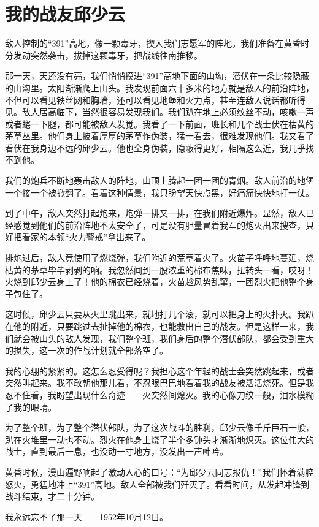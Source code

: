 \documentclass[12pt,UTF-8,openany]{ctexbook}
\begin{document}
\chapter{我的战友邱少云}

\begin{large}
    
    敌人控制的“391”高地，像一颗毒牙，揳入我们志愿军的阵地。我们准备在黄昏时分发动突然袭击，拔掉这颗毒牙，把战线往南推移。
    
    那一天，天还没有亮，我们悄悄摸进“391”高地下面的山坳，潜伏在一条比较隐蔽的山沟里。太阳渐渐爬上山头。我发现前面六十多米的地方就是敌人的前沿阵地，不但可以看见铁丝网和胸墙，还可以看见地堡和火力点，甚至连敌人说话都听得见。敌人居高临下，当然很容易发现我们。我们趴在地上必须纹丝不动，咳嗽一声或者蜷一下腿，都可能被敌人发觉。我看了一下前面，班长和几个战士伏在枯黄的茅草丛里。他们身上披着厚厚的茅草作伪装，猛一看去，很难发现他们。我又看了看伏在我身边不远的邱少云。他也全身伪装，隐蔽得更好，相隔这么近，我几乎找不到他。
    
    我们的炮兵不断地轰击敌人的阵地，山顶上腾起一团一团的青烟。敌人前沿的地堡一个接一个被掀翻了。看着这种情景，我只盼望天快点黑，好痛痛快快地打一仗。
    
    到了中午，敌人突然打起炮来，炮弹一排又一排，在我们附近爆炸。显然，敌人已经感觉到他们的前沿阵地不太安全了，可是没有胆量冒着我军的炮火出来搜查，只好把看家的本领“火力警戒”拿出来了。
    
    排炮过后，敌人竟使用了燃烧弹，我们附近的荒草着火了。火苗子呼呼地蔓延，烧枯黄的茅草毕毕剥剥的响。我忽然闻到一股浓重的棉布焦味，扭转头一看，哎呀！火烧到邱少云身上了！他的棉衣已经烧着，火苗趁风势乱窜，一团烈火把他整个身子包住了。
    
    这时候，邱少云只要从火里跳出来，就地打几个滚，就可以把身上的火扑灭。我趴在他的附近，只要跳过去扯掉他的棉衣，也能救出自己的战友。但是这样一来，我们就会被山头的敌人发现，我们整个班，我们身后的整个潜伏部队，都会受到重大的损失，这一次的作战计划就全部落空了。
    
    我的心绷的紧紧的。这怎么忍受得呢？我担心这个年轻的战士会突然跳起来，或者突然叫起来。我不敢朝他那儿看，不忍眼巴巴地看着我的战友被活活烧死。但是我忍不住看，我盼望出现什么奇迹——火突然间熄灭。我的心像刀绞一般，泪水模糊了我的眼睛。
    
    为了整个班，为了整个潜伏部队，为了这次战斗的胜利，邱少云像千斤巨石一般，趴在火堆里一动也不动。烈火在他身上烧了半个多钟头才渐渐地熄灭。这位伟大的战士，直到最后一息，也没动一寸地方，没发出一声呻吟。
    
    黄昏时候，漫山遍野响起了激动人心的口号：“为邱少云同志报仇！”我们怀着满腔怒火，勇猛地冲上“391”高地。敌人全部被我们歼灭了。看看时间，从发起冲锋到战斗结束，才二十分钟。
    
    我永远忘不了那一天——1952年10月12日。
    
\end{large}
\end{document}
